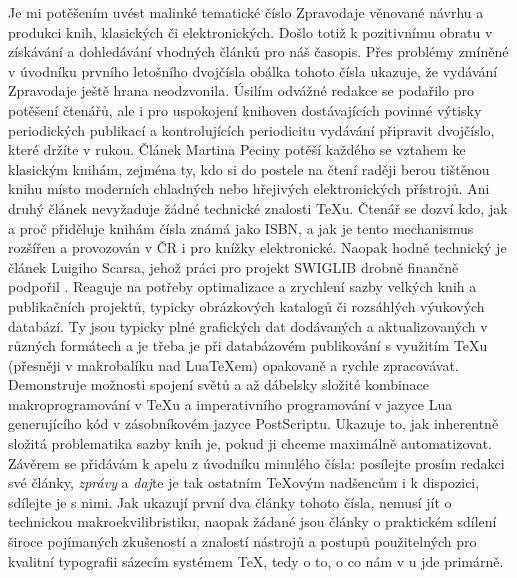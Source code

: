 Je mi potěšením uvést malinké tematické číslo Zpravodaje věnované návrhu a produkci knih, klasických či elektronických. Došlo totiž k pozitivnímu obratu v získávání a dohledávání vhodných článků pro náš časopis.  Přes problémy zmíněné v úvodníku prvního letošního dvojčísla obálka tohoto čísla ukazuje, že vydávání Zpravodaje ještě hrana neodzvonila.  Úsilím odvážné redakce se podařilo pro potěšení čtenářů, ale i pro uspokojení knihoven dostávajících povinné výtisky periodických publikací a kontrolujících periodicitu vydávání připravit dvojčíslo, které držíte v rukou.
Článek Martina Peciny potěší každého se vztahem ke klasickým knihám, zejména ty, kdo si do postele na čtení raději berou tištěnou knihu místo moderních chladných nebo hřejivých elektronických přístrojů.
Ani druhý článek nevyžaduje žádné technické znalosti \TeX u.  Čtenář se dozví kdo, jak a proč přiděluje knihám čísla známá jako ISBN, a jak je tento mechanismus rozšířen a provozován v ČR i pro knížky elektronické.
Naopak hodně technický je článek Luigiho Scarsa, jehož práci pro projekt SWIGLIB drobně finančně podpořil \CSTUG. Reaguje na potřeby optimalizace a zrychlení sazby velkých knih a publikačních projektů, typicky obrázkových katalogů či rozsáhlých výukových databází.  Ty jsou typicky plné grafických dat dodávaných a aktualizovaných v různých formátech a je třeba je při databázovém publikování s využitím \TeX u  (přesněji v makrobalíku \ConTeXt{} nad Lua\TeX em) opakovaně a rychle zpracovávat.  Demonstruje možnosti spojení světů a až dábelsky složité kombinace makroprogramování v \TeX u a imperativního programování v jazyce Lua generujícího kód v zásobníkovém jazyce PostScriptu. Ukazuje to, jak inherentně složitá problematika sazby knih je, pokud ji chceme maximálně automatizovat.
Závěrem se přidávám k apelu z úvodníku minulého čísla: posílejte prosím redakci své články, \emph{zprávy} a \emph{daj}te je tak ostatním \TeX ovým nadšencům i k dispozici, sdílejte je s nimi.  Jak ukazují první dva články tohoto čísla, nemusí jít o technickou makroekvilibristiku, naopak žádané jsou články o praktickém sdílení široce pojímaných zkušeností a znalostí nástrojů a postupů použitelných pro kvalitní typografii sázecím systémem \TeX, tedy o to, o co nám v \CSTUG u jde primárně.
